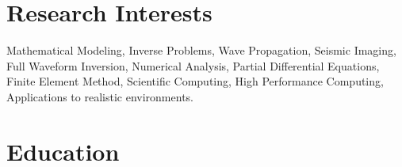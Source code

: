 \documentclass[10pt]{article} %
\begin{document}
\section{Research Interests}

Mathematical Modeling, Inverse Problems, Wave Propagation,  Seismic Imaging, Full Waveform Inversion,  Numerical Analysis, Partial Differential Equations,  Finite Element Method, Scientific Computing, High Performance Computing, 
 Applications to realistic environments.





\section{Education}
\end{document}
